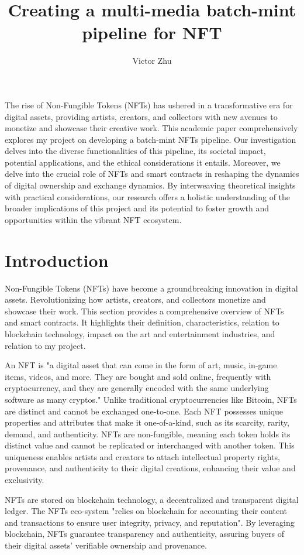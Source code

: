 \documentclass[10pt,twocolumn]{article}
\title{Creating a multi-media batch-mint pipeline for NFT}
\author{Victor Zhu}
\affiliation{Occidental College}
\begin{document}
\maketitle
\abstract
The rise of Non-Fungible Tokens (NFTs) has ushered in a transformative era for digital assets, providing artists, creators, and collectors with new avenues to monetize and showcase their creative work. This academic paper comprehensively explores my project on developing a batch-mint NFTs pipeline. Our investigation delves into the diverse functionalities of this pipeline, its societal impact, potential applications, and the ethical considerations it entails. Moreover, we delve into the crucial role of NFTs and smart contracts in reshaping the dynamics of digital ownership and exchange dynamics. By interweaving theoretical insights with practical considerations, our research offers a holistic understanding of the broader implications of this project and its potential to foster growth and opportunities within the vibrant NFT ecosystem.


\section{Introduction}
Non-Fungible Tokens (NFTs) have become a groundbreaking innovation in digital assets. Revolutionizing how artists, creators, and collectors monetize and showcase their work. This section provides a comprehensive overview of NFTs and smart contracts. It highlights their definition, characteristics, relation to blockchain technology, impact on the art and entertainment industries, and relation to my project.

An NFT is "a digital asset that can come in the form of art, music, in-game items, videos, and more. They are bought and sold online, frequently with cryptocurrency, and they are generally encoded with the same underlying software as many cryptos."\cite{forbesdefination} Unlike traditional cryptocurrencies like Bitcoin, NFTs are distinct and cannot be exchanged one-to-one. Each NFT possesses unique properties and attributes that make it one-of-a-kind, such as its scarcity, rarity, demand, and authenticity. NFTs are non-fungible, meaning each token holds its distinct value and cannot be replicated or interchanged with another token. This uniqueness enables artists and creators to attach intellectual property rights, provenance, and authenticity to their digital creations, enhancing their value and exclusivity.

NFTs are stored on blockchain technology, a decentralized and transparent digital ledger. The NFTs eco-system "relies on blockchain for accounting their content and transactions to ensure user integrity, privacy, and reputation".\cite{blockchainmeta} By leveraging blockchain, NFTs guarantee transparency and authenticity, assuring buyers of their digital assets' verifiable ownership and provenance.
\end{document}
